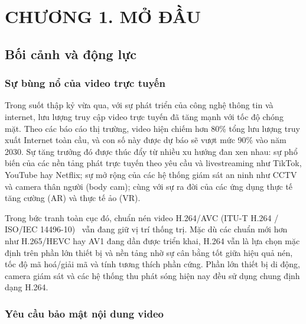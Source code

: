 \clearpage
{}
\section*{CHƯƠNG 1. MỞ ĐẦU}
\setcounter{section}{1}
\setcounter{subsection}{0}
\setcounter{figure}{0}
\setcounter{table}{0}
\setcounter{equation}{0}

\subsection{Bối cảnh và động lực}

\subsubsection{Sự bùng nổ của video trực tuyến}

Trong suốt thập kỷ vừa qua, với sự phát triển của công nghệ thông tin và internet, lưu lượng truy cập video trực tuyến đã tăng mạnh với tốc độ chóng mặt. Theo các báo cáo thị trường, video hiện chiếm hơn 80\% tổng lưu lượng truy xuất Internet toàn cầu, và con số này được dự báo sẽ vượt mức 90\% vào năm 2030. Sự tăng trưởng đó được thúc đẩy từ nhiều xu hướng đan xen nhau: sự phổ biến của các nền tảng phát trực tuyến theo yêu cầu và livestreaming như TikTok, YouTube hay Netflix; sự mở rộng của các hệ thống giám sát an ninh như CCTV và camera thân người (body cam); cùng với sự ra đời của các ứng dụng thực tế tăng cường (AR) và thực tế ảo (VR).

Trong bức tranh toàn cục đó, chuẩn nén video H.264/AVC (ITU-T H.264 / ISO/IEC 14496-10)~\cite{itu_h264} vẫn đang giữ vị trí thống trị. Mặc dù các chuẩn mới hơn như H.265/HEVC hay AV1 đang dần được triển khai, H.264 vẫn là lựa chọn mặc định trên phần lớn thiết bị và nền tảng nhờ sự cân bằng tốt giữa hiệu quả nén, tốc độ mã hoá/giải mã và tính tương thích phần cứng. Phần lớn thiết bị di động, camera giám sát và các hệ thống thu phát sóng hiện nay đều sử dụng chung định dạng H.264.

\subsubsection{Yêu cầu bảo mật nội dung video}

